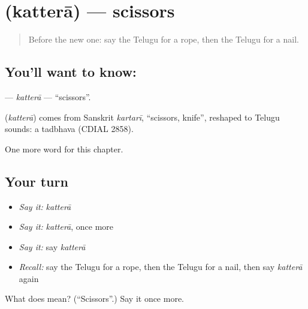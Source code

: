 \section[\texorpdfstring{\te{కత్తెర} (katterā)}{కత్తెర (katterā)}]{ (katterā) — scissors}

\label{lesson:TE-C110-kattera}



\begin{quote}
Before the new one: say the Telugu for a rope, then the Telugu for a nail.
\end{quote}

\subsection*{You'll want to know: }
\textbf{} — \emph{katterā} — \textquotedblleft{}scissors\textquotedblright{}.

\begin{cousinweb}
\textbf{} (\emph{katterā}) comes from Sanskrit \emph{kartarī}, \textquotedblleft{}scissors, knife\textquotedblright{}, reshaped to Telugu sounds: a tadbhava (CDIAL 2858).
\end{cousinweb}

\begin{grammarlens}[title={What you've built}]
One more word for this chapter.
\end{grammarlens}

\subsection*{Your turn}
\begin{itemize}
\raggedright
  \item \emph{Say it:} \emph{katterā}
  \item \emph{Say it:} \emph{katterā}, once more
  \item \emph{Say it:} say \emph{katterā}
  \item \emph{Recall:} say the Telugu for a rope, then the Telugu for a nail, then say \emph{katterā} again
\end{itemize}

\begin{tcolorbox}[breakable,colback=teal!4,colframe=teal!35!black,title={Before you move on}]
What does  mean? (\textquotedblleft{}Scissors\textquotedblright{}.) Say it once more.
\end{tcolorbox}
